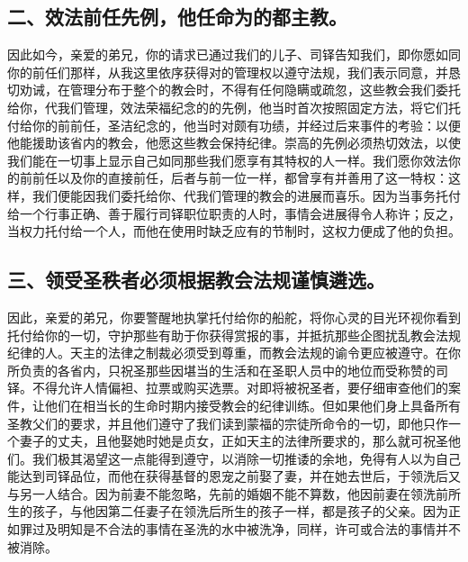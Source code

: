 
\subsection{二、效法前任先例，他任命为的都主教。}

因此如今，亲爱的弟兄，你的请求已通过我们的儿子、司铎告知我们，即你愿如同你的前任们那样，从我这里依序获得对的管理权以遵守法规，我们表示同意，并恳切劝诫，在管理分布于整个的教会时，不得有任何隐瞒或疏忽，这些教会我们委托给你，代我们管理，效法荣福纪念的的先例，他当时首次按照固定方法，将它们托付给你的前前任，圣洁纪念的，他当时对颇有功绩，并经过后来事件的考验：以便他能援助该省内的教会，他愿这些教会保持纪律。崇高的先例必须热切效法，以使我们能在一切事上显示自己如同那些我们愿享有其特权的人一样。我们愿你效法你的前前任以及你的直接前任，后者与前一位一样，都曾享有并善用了这一特权：这样，我们便能因我们委托给你、代我们管理的教会的进展而喜乐。因为当事务托付给一个行事正确、善于履行司铎职位职责的人时，事情会进展得令人称许；反之，当权力托付给一个人，而他在使用时缺乏应有的节制时，这权力便成了他的负担。\par


\subsection{三、领受圣秩者必须根据教会法规谨慎遴选。}

因此，亲爱的弟兄，你要警醒地执掌托付给你的船舵，将你心灵的目光环视你看到托付给你的一切，守护那些有助于你获得赏报的事，并抵抗那些企图扰乱教会法规纪律的人。天主的法律之制裁必须受到尊重，而教会法规的谕令更应被遵守。在你所负责的各省内，只祝圣那些因堪当的生活和在圣职人员中的地位而受称赞的司铎。不得允许人情偏袒、拉票或购买选票。对即将被祝圣者，要仔细审查他们的案件，让他们在相当长的生命时期内接受教会的纪律训练。但如果他们身上具备所有圣教父们的要求，并且他们遵守了我们读到蒙福的宗徒所命令的一切，即他只作一个妻子的丈夫，且他娶她时她是贞女，正如天主的法律所要求的，那么就可祝圣他们。我们极其渴望这一点能得到遵守，以消除一切推诿的余地，免得有人以为自己能达到司铎品位，而他在获得基督的恩宠之前娶了妻，并在她去世后，于领洗后又与另一人结合。因为前妻不能忽略，先前的婚姻不能不算数，他因前妻在领洗前所生的孩子，与他因第二任妻子在领洗后所生的孩子一样，都是孩子的父亲。因为正如罪过及明知是不合法的事情在圣洗的水中被洗净，同样，许可或合法的事情并不被消除。\par

